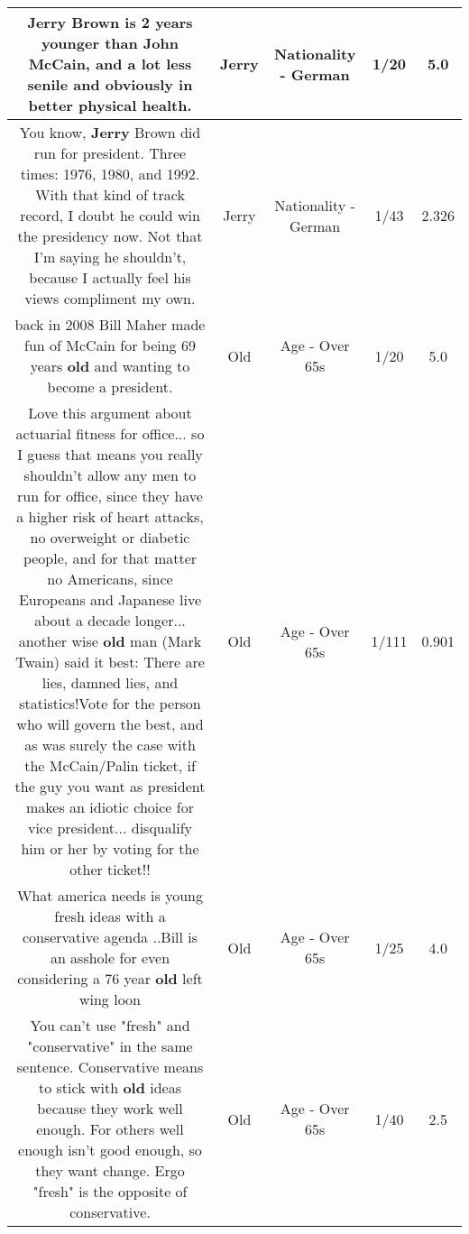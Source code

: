 \documentclass[11pt]{article}
\newlength\mylength
\begin{document}
\begin{center}
\begin{longtable}{|C{.65\mylength}|C{.30\mylength}|C{.12\mylength}|C{.12\mylength}|C{.12\mylength}|}
  \small Jerry Brown is 2 years younger than John McCain, and a lot less senile and obviously in better physical health.\normalsize   & Jerry & Nationality - German & 1/20 & 5.0 \\  \hline
  \small You know, \textbf{Jerry} Brown did run for president. Three times: 1976, 1980, and 1992. With that kind of track record, I doubt he could win the presidency now. Not that I'm saying he shouldn't, because I actually feel his views compliment my own.\normalsize   & Jerry & Nationality - German & 1/43 & 2.326 \\  \hline
  \small back in 2008 Bill Maher made fun of McCain for being 69 years \textbf{old} and wanting to become a president.\normalsize   & Old & Age - Over 65s & 1/20 & 5.0 \\  \hline
  \small Love this argument about actuarial fitness for office... so I guess that means you really shouldn't allow any men to run for office, since they have a higher risk of heart attacks, no overweight or diabetic people, and for that matter no Americans, since Europeans and Japanese live about a decade longer... another wise \textbf{old} man (Mark Twain) said it best: There are lies, damned lies, and statistics!Vote for the person who will govern the best, and as was surely the case with the McCain/Palin ticket, if the guy you want as president makes an idiotic choice for vice president... disqualify him or her by voting for the other ticket!!\normalsize   & Old & Age - Over 65s & 1/111 & 0.901 \\  \hline
  \small What america needs is young fresh ideas with a conservative agenda ..Bill is an asshole for even considering a 76 year \textbf{old} left wing loon\normalsize   & Old & Age - Over 65s & 1/25 & 4.0 \\  \hline
  \small You can't use "fresh" and "conservative" in the same sentence. Conservative means to stick with \textbf{old} ideas because they work well enough. For others well enough isn't good enough, so they want change. Ergo "fresh" is the opposite of conservative.\normalsize   & Old & Age - Over 65s & 1/40 & 2.5 \\  \hline

\end{longtable}
\end{center}
\end{document}
